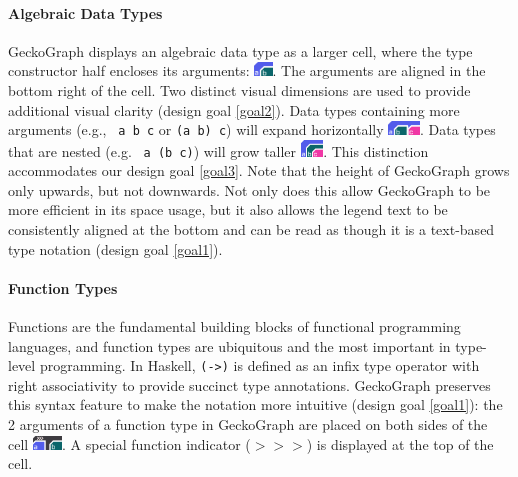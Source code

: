 \documentclass[preprint,12pt]{elsarticle}
\begin{document}
\paragraph{Algebraic Data Types}
GeckoGraph displays an algebraic data type as a larger cell, where the type constructor half encloses its arguments: \includegraphics[height=1em]{figures/DataType.png}. The arguments are aligned in the bottom right of the cell. Two distinct visual dimensions are used to provide additional visual clarity (design goal \ref{goal2}). Data types containing more arguments (e.g., \texttt{ a b c} or \texttt{(a b) c}) will expand horizontally \includegraphics[height=1em]{figures/DataTypeWide.png}. Data types that are nested (e.g. \texttt{ a (b c)}) will grow taller \includegraphics[height=1.2em]{figures/DataTypeNested.png}. This distinction accommodates our design goal \ref{goal3}. Note that the height of GeckoGraph grows only upwards, but not downwards. Not only does this allow GeckoGraph to be more efficient in its space usage, but it also allows the legend text to be consistently aligned at the bottom and can be read as though it is a text-based type notation (design goal \ref{goal1}).  

\paragraph{Function Types}
Functions are the fundamental building blocks of functional programming languages, and function types are ubiquitous and the most important in type-level programming. In Haskell, \texttt{(->)} is defined as an infix type operator with right associativity to provide succinct type annotations. GeckoGraph preserves this syntax feature to make the notation more intuitive (design goal \ref{goal1}): the 2 arguments of a function type in GeckoGraph are placed on both sides of the cell \includegraphics[height=1em]{figures/Function.png}. A special function indicator (\texttt{$>>>$}) is displayed at the top of the cell. 
\end{document}

